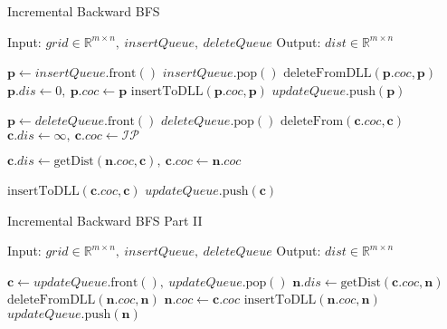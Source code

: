 \documentclass{article}
\begin{document}
\begin{algorithm}
    \caption{Incremental Backward BFS}
    \begin{algorithmic}[1]
        \STATE Input: $grid \in \mathbb{R}^{m \times n},\ insertQueue,\ deleteQueue$
        \STATE Output: $dist \in \mathbb{R}^{m \times n}$

            \STATE $\bm{p} \gets insertQueue.\mathrm{front}()$
            \STATE $insertQueue.\mathrm{pop}()$
            \STATE $\mathrm{deleteFromDLL}(\bm{p}.coc, \bm{p})$
            \STATE $\bm{p}.dis \gets 0,\ \bm{p}.coc \gets \bm{p}$
            \STATE $\mathrm{insertToDLL}(\bm{p}.coc, \bm{p})$
            \STATE $updateQueue.\mathrm{push}(\bm{p})$
        \ENDWHILE

            \STATE $\bm{p} \gets deleteQueue.\mathrm{front}()$
            \STATE $deleteQueue.\mathrm{pop}()$
                \STATE $\mathrm{deleteFrom}(\bm{c}.coc, \bm{c})$
                \STATE $\bm{c}.dis \gets \infty,\ \bm{c}.coc \gets \mathcal{IP}$

                        \STATE $\bm{c}.dis \gets \mathrm{getDist}(\bm{n}.coc, \bm{c}),\ \bm{c}.coc \gets \bm{n}.coc$
                    \ENDIF
                \ENDFOR

                \STATE $\mathrm{insertToDLL}(\bm{c}.coc, \bm{c})$
                    \STATE $updateQueue.\mathrm{push}(\bm{c})$
                \ENDIF
            \ENDFOR
        \ENDWHILE
    \end{algorithmic}
\end{algorithm}

\begin{algorithm}
    \caption{Incremental Backward BFS Part II}
    \begin{algorithmic}[1]
        \STATE Input: $grid \in \mathbb{R}^{m \times n},\ insertQueue,\ deleteQueue$
        \STATE Output: $dist \in \mathbb{R}^{m \times n}$

            \STATE $\bm{c} \gets updateQueue.\mathrm{front}(),\ updateQueue.\mathrm{pop}()$
                    \STATE $\bm{n}.dis \gets \mathrm{getDist}(\bm{c}.coc, \bm{n})$
                    \STATE $\mathrm{deleteFromDLL}(\bm{n}.coc, \bm{n})$
                    \STATE $\bm{n}.coc \gets \bm{c}.coc$
                    \STATE $\mathrm{insertToDLL}(\bm{n}.coc, \bm{n})$
                    \STATE $updateQueue.\mathrm{push}(\bm{n})$
                \ENDIF
            \ENDFOR
        \ENDWHILE
    \end{algorithmic}
\end{algorithm}
\end{document}
